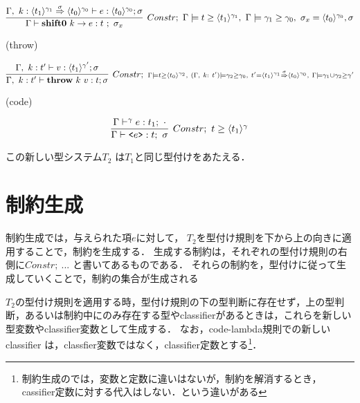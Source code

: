 \[
  \infer[Constr;~\Gamma \models \longer{t}{\codeT{t_1}{\gamma_1}},~ \Gamma \models \longer{\gamma_1}{\gamma_0},~ \sigma_x = \codeT{t_0}{\gamma_0}, \sigma]
  {\Gamma \vdash \shiftz{k}{e} : t~;~ \sigma_x}
  {\Gamma,~k:\contT{\codeT{t_1}{\gamma_1}}{\codeT{t_0}{\gamma_0}}{\sigma}
    \vdash e : \codeT{t_0}{\gamma_0} ; \sigma
  }
\]

(throw)

\[
  \infer[Constr;~ {\scriptstyle \Gamma \models \longer{t}{\codeT{t_0}{\gamma_2}},~ (\Gamma,~ k:~t') \models \gamma_2 \ord \gamma_0,~  t' = \contT{\codeT{t_1}{\gamma_1}}{\codeT{t_0}{\gamma_0}}{\sigma},~ \Gamma \models \gamma_1 \uni \gamma_2 \ord \gamma'}]
  {\Gamma,~ k:t'
    \vdash \throw{k}{v} : t ; \sigma}
  {\Gamma,~ k:t'
    \vdash v : \codeT{t_1}{\gamma'} ; \sigma
  }
\]

(code)

\[
  \infer[Constr;~\longer{t}{\codeT{t_1}{\gamma}}]
  {\Gamma \vdash \code{e} : t;~\sigma}
  {\Gamma \vdash^\gamma e : t_1;~\cdot}
\]


この新しい型システム$T_2$ は$T_1$と同じ型付けをあたえる．

\section{制約生成}

制約生成では，与えられた項$e$に対して，
$T_2$を型付け規則を下から上の向きに適用することで，制約を生成する．
生成する制約は，それぞれの型付け規則の右側に$Constr;~ ...$ と書いてあるものである．
それらの制約を，型付けに従って生成していくことで，制約の集合が生成される

$T_2$の型付け規則を適用する時，型付け規則の下の型判断に存在せず，上の型判断，あるいは制約中にのみ存在する型やclassifierがあるときは，これらを新しい型変数やclassifier変数として生成する．
なお，code-lambda規則での新しいclassifier は，classfier変数ではなく，classifier定数とする\footnote{制約生成のでは，変数と定数に違いはないが，制約を解消するとき，cassifier定数に対する代入はしない．という違いがある}．

